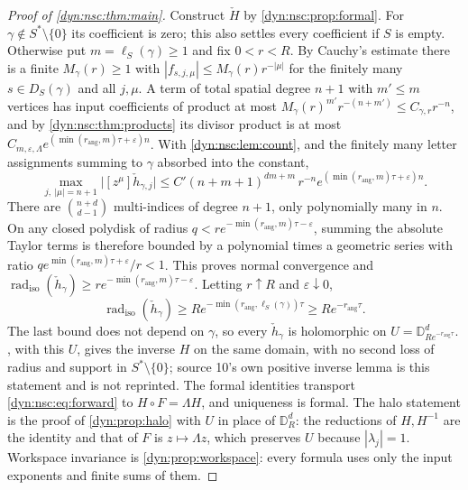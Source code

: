\documentclass[11pt,letterpaper]{article}
\theoremstyle{definition}
\theoremstyle{remark}
\newcommand{\radiso}{\operatorname{rad}_{\mathrm{iso}}}
\newcommand{\eps}{\varepsilon}
\newcommand{\rang}{r_{\mathrm{ang}}}
\numberwithin{equation}{section}
\begin{document}
\begin{proof}[Proof of \cref{dyn:nsc:thm:main}]
Construct $\check H$ by \cref{dyn:nsc:prop:formal}. For
$\gamma\notin S^{*}\setminus\{0\}$ its coefficient is zero; this also
settles every coefficient if $S$ is empty. Otherwise put
$m=\ell_S(\gamma)\ge1$ and fix $0<r<R$. By Cauchy's estimate there is a finite
$M_\gamma(r)\ge1$ with
$|f_{s,j,\mu}|\le M_\gamma(r)r^{-|\mu|}$ for the finitely many $s\in D_S(\gamma)$
and all $j,\mu$. A term of total spatial degree $n+1$ with $m'\le m$
vertices has input coefficients of product at most
$M_\gamma(r)^{m'}r^{-(n+m')}\le C_{\gamma,r}r^{-n}$, and by
\cref{dyn:nsc:thm:products} its divisor product is at most
$C_{m,\eps,\Lambda}e^{(\min(\rang,m)\tau+\eps)n}$. With
\cref{dyn:nsc:lem:count}, and the finitely many letter assignments summing
to $\gamma$ absorbed into the constant,
\begin{equation}\label{dyn:nsc:eq:coefbound}
 \max_{j,\ |\mu|=n+1}\bigl|[z^{\mu}]\check h_{\gamma,j}\bigr|
 \le C'(n+m+1)^{dm+m}\,r^{-n}e^{(\min(\rang,m)\tau+\eps)n}.
\end{equation}
There are $\binom{n+d}{d-1}$ multi-indices of degree $n+1$, only
polynomially many in $n$. On any closed polydisk of radius
$q<re^{-\min(\rang,m)\tau-\eps}$, summing the absolute Taylor terms is
therefore bounded by a polynomial times a geometric series with ratio
$q e^{\min(\rang,m)\tau+\eps}/r<1$. This proves normal convergence and
$\radiso(\check h_\gamma)\ge re^{-\min(\rang,m)\tau-\eps}$.
Letting $r\uparrow R$ and $\eps\downarrow0$,
\begin{equation}\label{dyn:nsc:eq:localdepth}
 \radiso(\check h_\gamma)\ge Re^{-\min(\rang,\ell_S(\gamma))\tau}\ge Re^{-\rang\tau}.
\end{equation}
The last bound does not depend on $\gamma$, so every $\check h_\gamma$ is
holomorphic on $U=\mathbb D^{d}_{Re^{-\rang\tau}}$. ,
with this $U$, gives the inverse $H$ on the same domain, with no second loss
of radius and support in $S^{*}\setminus\{0\}$; source 10's own positive
inverse lemma is this statement and is not reprinted. The formal identities
transport \eqref{dyn:nsc:eq:forward} to $H\circ F=\Lambda H$, and uniqueness
is formal. The halo statement is the proof of \cref{dyn:prop:halo} with $U$
in place of $\mathbb D_R^{d}$: the reductions of $H,H^{-1}$ are the identity
and that of $F$ is $z\mapsto\Lambda z$, which preserves $U$ because
$|\lambda_j|=1$. Workspace invariance is \cref{dyn:prop:workspace}: every
formula uses only the input exponents and finite sums of them.
\end{proof}
\end{document}
